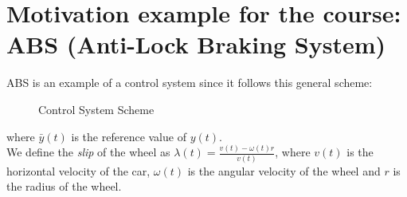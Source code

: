 \section{Motivation example for the course: ABS (Anti-Lock Braking System)} \label{abs_ex}
ABS is an example of a control system since it follows this general scheme:
\begin{figure}[H]
    \centering
	\caption*{Control System Scheme}
\end{figure}
    
where $\bar{y}(t)$ is the reference value of $y(t)$.\\

We define the \emph{slip} of the wheel as $\lambda(t) = \frac{v(t)-\omega(t) r}{v(t)}$, where $v(t)$ is the horizontal velocity of the car, $\omega(t)$ is the angular velocity of the wheel and $r$ is the radius of the wheel.\\

